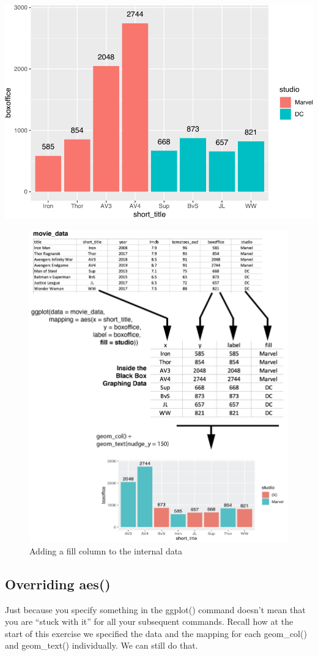 \documentclass[
]{krantz}
\begin{document}
\includegraphics[width=0.65\linewidth]{bookdown_files/figure-latex/unnamed-chunk-105-1}

\begin{figure}
\includegraphics[width=0.7\linewidth]{ch_graphing/images/mapping_fill} \caption{Adding a fill column to the internal data}\label{fig:addfill}
\end{figure}

\hypertarget{overriding-aes}{%
\subsection{Overriding aes()}\label{overriding-aes}}

Just because you specify something in the ggplot() command doesn't mean that you are ``stuck with it'' for all your subsequent commands. Recall how at the start of this exercise we specified the data and the mapping for each geom\_col() and geom\_text() individually. We can still do that.
\end{document}
